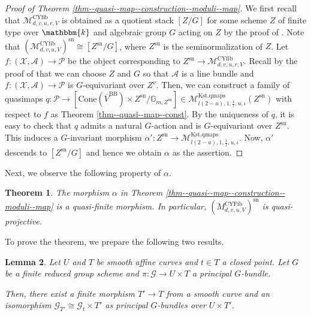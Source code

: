 \documentclass[12pt,twoside]{amsart}
\newtheorem{thm}{Theorem}[section]
\newtheorem{lem}[thm]{Lemma}
\theoremstyle{definition}
\begin{document}
 \begin{proof}[Proof of Theorem \ref{thm--quasi--map--construction--moduli--map}]
We first recall that $\mathcal{M}^{\mathrm{CYfib}}_{d,v,u,r,V}$ is obtained as a quotient stack $[Z/G]$ for some scheme $Z$ of finite type over $\mathbbm{k}$ and algebraic group $G$ acting on $Z$ by the proof of \cite[Theorem 1.3, 5.1]{HH}.
Note that $(\mathcal{M}^{\mathrm{CYfib}}_{d,v,u,V})^{\mathrm{sn}}\cong [Z^{\mathrm{sn}}/G]$, where $Z^{\mathrm{sn}}$ is the seminormalization of $Z$.
Let $f\colon(\mathcal{X},\mathcal{A})\to \mathcal{P}$ be the object corresponding to $Z^{\mathrm{sn}}\to \mathcal{M}^{\mathrm{CYfib}}_{d,v,u,r,V}$.
Recall by the proof of \cite[Theorems 1.3, 5.1]{HH} that we can choose $Z$ and $G$ so that $\mathcal{A}$ is a line bundle and $f\colon(\mathcal{X},\mathcal{A})\to \mathcal{P}$ is $G$-equivariant over $Z^\nu$.
Then, we can construct a family of quasimaps $q\colon\mathcal{P}\to[\mathrm{Cone}(\overline{V}^{\mathrm{BB}})\times Z^{\mathrm{sn}}/\mathbb{G}_{m,Z^{\mathrm{sn}}}]\in \mathcal{M}^{\mathrm{Kst.qmaps}}_{l(2-u),1,\frac{1}{l},u,\iota}(Z^{\mathrm{sn}})$ with respect to $f$ as Theorem \ref{thm--quasi--map--const}. 
By the uniqueness of $q$, it is easy to check that $q$ admits a natural $G$-action and is $G$-equivariant over $Z^{\mathrm{sn}}$.
This induces a $G$-invariant morphism $\alpha'\colon Z^{\mathrm{sn}}\to \mathcal{M}^{\mathrm{Kst.qmaps}}_{l(2-u),1,\frac{1}{l},u,\iota}$.
Now, $\alpha'$ descends to $[Z^{\mathrm{sn}}/G]$ and hence we obtain $\alpha$ as the assertion.
\end{proof}

Next, we observe the following property of $\alpha$.



\begin{thm}\label{thm--quasi-finiteness--of--two--moduli}
The morphism $\alpha$ in Theorem \ref{thm--quasi--map--construction--moduli--map} is a quasi-finite morphism.
In particular, $(M_{d,v,u,V}^{\mathrm{CYFib}})^{\mathrm{sn}}$ is quasi-projective.
\end{thm}

To prove the theorem, we prepare the following two results. 


\begin{lem}\label{lem--principal-g-bundle-isotrivial}
    Let $U$ and $T$ be smooth affine curves and $t\in T$ a closed point.
    Let $G$ be a finite reduced group scheme and $\pi\colon\mathscr{G}\to U\times T$ a principal $G$-bundle.

    Then, there exist a finite morphism $T'\to T$ from a smooth curve and an isomorphism $\mathscr{G}_{T'}\cong\mathscr{G}_{t}\times T'$ as principal $G$-bundles over $U\times T'$.
\end{lem}
\end{document}
